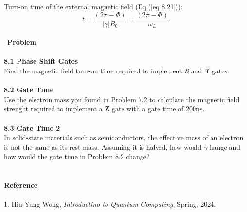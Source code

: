 \documentclass{article}
\newcommand{\bfit}[1]{\textit{\textbf{#1}}}
\begin{document}
Turn-on time of the external magnetic field (Eq.(\ref{eq 8.21})):
\begin{equation}\label{eq 8.26}
    t=\frac{(2\pi-\varPhi)}{|\gamma|B_0}=\frac{(2\pi-\varPhi)}{\omega_L}.\tag{8.26}
\end{equation}\\\
\textbf{\large Problem}\\\\
\textbf{8.1 Phase Shift Gates}\\
Find the magnetic field turn-on time required to implement \bfit{S} and \bfit{T} gates.
\\\\
\textbf{8.2 Gate Time}\\
Use the electron mass you found in Problem 7.2 to calculate the magnetic field
strenght required to implement a \textbf{Z} gate with a gate time of 200ns.\\\\
\textbf{8.3 Gate Time 2}\\
In solid-state materials such as semiconductors, the effective mass of an electron is not the
same as its rest mass. Assuming it is halved, how would $\gamma$ hange and how 
would the gate time in Problem 8.2 change?\\\\\\
\textbf{\large Reference}
\\\\
1. Hiu-Yung Wong, \textit{Introductino to Quantum Computing}, Spring, 2024.
\end{document}

